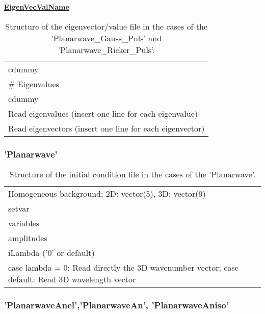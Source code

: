 \documentclass[12pt,twoside]{article}
\begin{document}
\newpage

\uline{\textbf{EigenVecValName}}

\begin{table}[H]
\caption{Structure of the eigenvector/value file in the cases of the 'Planarwave\_Gauss\_Puls' and 'Planarwave\_Ricker\_Puls'.}
\begin{center}
\begin{tabular}{l}
\hline
 cdummy\\
 \# Eigenvalues\\
 cdummy\\
 Read eigenvalues (insert one line for each eigenvalue)\\
 Read eigenvectors (insert one line for each eigenvector)\\
\hline
\end{tabular}
\end{center}
\label{eigenvec1-file}
\end{table}

\subsubsection{'Planarwave'}

\begin{table}[H]
\caption{Structure of the initial condition file in the cases of the 'Planarwave'.}
\begin{center}
\begin{tabular}{l}
\hline
Homogeneous background; 2D: vector(5), 3D: vector(9)\\
setvar\\
variables\\
amplitudes\\
iLambda ('0' or default)\\
case lambda = 0: Read directly the 3D wavenumber vector; case default: Read 3D wavelength vector\\
\hline
\end{tabular}
\end{center}
\label{ini3-file}
\end{table}

\newpage

\subsubsection{'PlanarwaveAnel','PlanarwaveAn', 'PlanarwaveAniso'}
\end{document}
